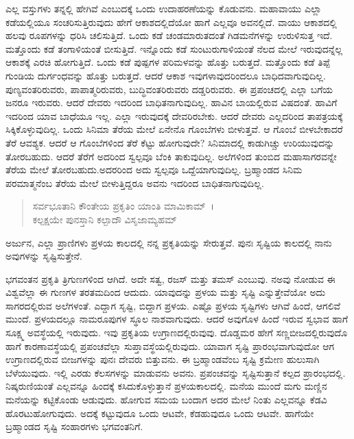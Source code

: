 ಎಲ್ಲ ವಸ್ತುಗಳು ತನ್ನಲ್ಲಿ ಹೇಗಿವೆ ಎಂಬುದಕ್ಕೆ ಒಂದು ಉದಾಹರಣೆಯನ್ನು ಕೊಡುವನು. ಮಹಾವಾಯು ಎಲ್ಲಾ ಕಡೆಯಲ್ಲಿಯೂ ಸಂಚರಿಸುತ್ತಿರುವುದು ಹೇಗೆ ಆಕಾಶದಲ್ಲಿದೆಯೋ ಹಾಗೆ ಎಲ್ಲವೂ ಅವನಲ್ಲಿದೆ. ವಾಯು ಆಕಾಶದಲ್ಲಿ ಹಲವು ರೂಪಗಳನ್ನು ಧರಿಸಿ ಚಲಿಸುತ್ತಿದೆ. ಒಂದು ಕಡೆ ಚಂಡಮಾರುತದಂತೆ ಗಿಡಮನೆಗಳನ್ನು ಉರುಳಿಸುತ್ತ ಇದೆ. ಮತ್ತೊಂದು ಕಡೆ ತಂಗಾಳಿಯಂತೆ ಬೀಸುತ್ತಿದೆ. ಇನ್ನೊಂದು ಕಡೆ ಸುಂಟುರುಗಾಳಿಯಂತೆ ನೆಲದ ಮೇಲೆ ಇರುವುದನ್ನೆಲ್ಲ ಆಕಾಶಕ್ಕೆ ಎರಚಿ ಹೋಗುತ್ತಿದೆ. ಒಂದು ಕಡೆ ಪುಷ್ಪಗಳ ಪರಿಮಳವನ್ನು ಹೊತ್ತು ಬರುತ್ತದೆ. ಮತ್ತೊಂದು ಕಡೆ ತಿಪ್ಪೆ ಗುಂಡಿಯ ದುರ್ಗಂಧವನ್ನು ಹೊತ್ತು ಬರುತ್ತದೆ. ಆದರೆ ಆಕಾಶ ಇವುಗಳಾವುದರಿಂದಲೂ ಬಾಧಿದವಾಗುವುದಿಲ್ಲ. ಪುಣ್ಯವಂತರಿರುವರು, ಪಾಪಾತ್ಮರಿರುವರು, ಬುದ್ಧಿವಂತರಿರುವರು ದಡ್ಡರಿರುವರು. ಈ ಪ್ರಪಂಚದಲ್ಲಿ ಎಲ್ಲಾ ಬಗೆಯ ಜನರೂ ಇರುವರು. ಆದರೆ ದೇವರು ಇದರಿಂದ ಬಾಧಿತನಾಗುವುದಿಲ್ಲ. ಹಾವಿನ ಬಾಯಲ್ಲಿರುವ ವಿಷದಂತೆ. ಹಾವಿಗೆ ಇದರಿಂದ ಯಾವ ಬಾಧೆಯೂ ಇಲ್ಲ. ಎಲ್ಲಾ ಇರುವುದಕ್ಕೆ ದೇವರಿರಬೇಕು. ಆದರೆ ದೇವರು ಎಲ್ಲದರಿಂದ ತಾಪತ್ರಯಕ್ಕೆ ಸಿಕ್ಕಿಕೊಳ್ಳುವುದಿಲ್ಲ. ಒಂದು ಸಿನಿಮಾ ತೆರೆಯ ಮೇಲೆ ಏನೇನೊ ಗೊಂಬೆಗಳು ಬೀಳುತ್ತವೆ. ಆ ಗೊಂಬೆ ಬೀಳಬೇಕಾದರೆ ತೆರೆ ಆವಶ್ಯಕ. ಆದರೆ ಆ ಗೊಂಬೆಗಳಿಂದ ತೆರೆ ಕೆಟ್ಟು ಹೋಗುವುದೇ? ಸಿನಿಮಾದಲ್ಲಿ ಕಾಡುಗಿಚ್ಚು ಉರಿಯುವುದನ್ನು ತೋರಬಹುದು. ಆದರೆ ತೆರೆಗೆ ಅದರಿಂದ ಸ್ವಲ್ಪವೂ ಬೆಂಕಿ ತಾಕುವುದಿಲ್ಲ. ಅಲೆಗಳಿಂದ ತುಂಬಿದ ಮಹಾಸಾಗರವನ್ನೇ ತೆರೆಯ ಮೇಲೆ ತೋರಬಹುದು.ಅದರರಿಂದ ಅದು ಸ್ವಲ್ಪವೂ ಒದ್ದೆಯಾಗುವುದಿಲ್ಲ. ಬ್ರಹ್ಮಾಂಡದ ಸಿನಿಮ ಪರಮಾತ್ಮನೆಂಬ ತೆರೆಯ ಮೇಲೆ ಬೀಳುತ್ತಿದ್ದರೂ ಅವನು ಇದರಿಂದ ಬಾಧಿತನಾಗುವುದಿಲ್ಲ.

\begin{verse}
ಸರ್ವಭೂತಾನಿ ಕೌಂತೇಯ ಪ್ರಕೃತಿಂ ಯಾಂತಿ ಮಾಮಿಕಾಮ್~।\\ಕಲ್ಪಕ್ಷಯೇ ಪುನಸ್ತಾನಿ ಕಲ್ಪಾದೌ ವಿಸೃಜಾಮ್ಯಹಮ್ 
\end{verse}

ಅರ್ಜುನ, ಎಲ್ಲಾ ಪ್ರಾಣಿಗಳು ಪ್ರಳಯ ಕಾಲದಲ್ಲಿ ನನ್ನ ಪ್ರಕೃತಿಯನ್ನು ಸೇರುತ್ತವೆ. ಪುನಃ ಸೃಷ್ಟಿಯ ಕಾಲದಲ್ಲಿ ನಾನು ಅವುಗಳನ್ನು ಸೃಷ್ಟಿಸುತ್ತೇನೆ.

ಭಗವಂತನ ಪ್ರಕೃತಿ ತ್ರಿಗುಣಗಳಿಂದ ಆಗಿದೆ. ಅದೇ ಸತ್ವ, ರಜಸ್ ಮತ್ತು ತಮಸ್ ಎಂಬುವು. ನಅವು ನೋಡುವ ಈ ವಿಶ್ವವೆಲ್ಲಾ ಈ ಗುಣಗಳ ತರತಮದಿಂದ ಆದುದು. ಯಾವುದನ್ನು ಪ್ರಳಯ ಮತ್ತು ಸೃಷ್ಟಿ ಎನ್ನುತ್ತೇವೆಯೋ ಅದು ಸಾಗರದಲ್ಲಿರುವ ಅಲೆಗಳಂತೆ. ಎದ್ದಾಗ ಸೃಷ್ಟಿ, ಬಿದ್ದಾಗ ಪ್ರಳಯ. ಎಷ್ಟೊ ಪ್ರಳಯ ಸೃಷ್ಟಿಗಳು ಆಗಿವೆ ಹಿಂದೆ, ಆಗಲಿವೆ ಮುಂದೆ. ಪ್ರಳಯದಲ್ಲೂ ನಾಮರೂಪುಗಳ ಸ್ಥೂಲ ನಾಶವಾಗುವುದು. ಆದರೆ ಅವುಗೊಳ ಹಿಂದೆ ಇರುವ ಸ್ವಭಾವ ಹಾಗೆ ಸೂಕ್ಷ್ಮ ಅವಸ್ಥೆಯಲ್ಲಿ ಇರುವುದು. ಇವು ಪ್ರಕೃತಿಯ ಉಗ್ರಾಣದಲ್ಲಿರುವುವು. ದೊಡ್ಡಮರ ಹೇಗೆ ಸಣ್ಣಬೀಜದಲ್ಲಿರುವುದೊ ಹಾಗೆ ಕಾರಣಾವಸ್ಥೆಯಲ್ಲಿ ಪ್ರಪಂಚವೆಲ್ಲಾ ಸುಪ್ತಾವಸ್ಥೆಯಲ್ಲಿರುವುದು. ಯಾವಾಗ ಸೃಷ್ಟಿ ಪ್ರಾರಂಭವಾಗುವುದೋ ಆಗ ಉಗ್ರಾಣದಲ್ಲಿರುವ ಬೀಜಗಳನ್ನು ಪುನಃ ದೇವರು ಬಿತ್ತುವನು. ಈ ಬ್ರಹ್ಮಾಂಡವೆಂಬ ಸೃಷ್ಟಿ ಕ್ರಮೇಣ ಹುಲುಸಾಗಿ ಬೆಳೆಯುವುದು. ಇಲ್ಲಿ ಎರಡು ಕೆಲಸಗಳನ್ನು ಮಾಡುವನು ಅವನು. ಪ್ರಪಂಚವನ್ನು ಸೃಷ್ಟಿಸುತ್ತಾನೆ ಕಲ್ಪದ ಪ್ರಾರಂಭದಲ್ಲಿ. ನಿಷ್ಕರುಣಿಯಂತೆ ಎಲ್ಲವನ್ನೂ ಹಿಂದಕ್ಕೆ ಕಸಿದುಕೊಳ್ಳುತ್ತಾನೆ ಪ್ರಳಯಕಾಲದಲ್ಲಿ. ಮನೆಯ ಮುಂದೆ ಮಗು ಮಣ್ಣಿನ ಮನೆಯನ್ನು ಕಟ್ಟಿಕೊಂಡು ಆಡುವುದು. ಹೋಗುವ ಸಮಯ ಬಂದಾಗ ಅದರ ಮೇಲೆ ನಿಂತು ಎಲ್ಲವನ್ನೂ ಕೆಡವಿ ಹೊರಟುಹೋಗುವುದು. ಅದಕ್ಕೆ ಕಟ್ಟುವುದೂ ಒಂದು ಆಟವೇ, ಕೆಡಹುವುದೂ ಒಂದು ಆಟವೇ. ಹಾಗೆಯೇ ಬ್ರಹ್ಮಾಂಡದ ಸೃಷ್ಟಿ ಸಂಹಾರಗಳು ಭಗವಂತನಿಗೆ.

